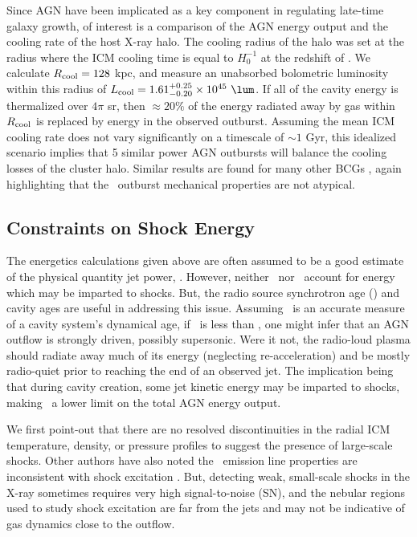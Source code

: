 \documentclass[useAMS,usenatbib]{mn2e}
\begin{document}
Since AGN have been implicated as a key component in regulating
late-time galaxy growth, of interest is a comparison of the AGN energy
output and the cooling rate of the host X-ray halo. The cooling radius
of the halo was set at the radius where the ICM cooling time is equal
to $H_0^{-1}$ at the redshift of \irs. We calculate $R_{\rm{cool}} =
128$ kpc, and measure an unabsorbed bolometric luminosity within this
radius of $L_{\rm{cool}} = 1.61^{+0.25}_{-0.20} \times 10^{45}
~\lum$. If all of the cavity energy is thermalized over $4\pi$ sr,
then $\approx 20\%$ of the energy radiated away by gas within
$R_{\rm{cool}}$ is replaced by energy in the observed
outburst. Assuming the mean ICM cooling rate does not vary
significantly on a timescale of $\sim 1$ Gyr, this idealized scenario
implies that 5 similar power AGN outbursts will balance the cooling
losses of the cluster halo. Similar results are found for many other
BCGs \citep[\eg][]{rafferty06}, again highlighting that the
\irs\ outburst mechanical properties are not atypical.

\subsection{Constraints on Shock Energy}

The energetics calculations given above are often assumed to be a good
estimate of the physical quantity jet power, \pjet. However, neither
\pcav\ nor \pjet\ account for energy which may be imparted to shocks.
But, the radio source synchrotron age (\tsync) and cavity ages are
useful in addressing this issue. Assuming \tsync\ is an accurate
measure of a cavity system's dynamical age, if \tsync\ is less than
\tsonic, one might infer that an AGN outflow is strongly driven,
possibly supersonic. Were it not, the radio-loud plasma should radiate
away much of its energy (neglecting re-acceleration) and be mostly
radio-quiet prior to reaching the end of an observed jet. The
implication being that during cavity creation, some jet kinetic energy
may be imparted to shocks, making \ecav\ a lower limit on the total
AGN energy output.

We first point-out that there are no resolved discontinuities in the
radial ICM temperature, density, or pressure profiles to suggest the
presence of large-scale shocks. Other authors have also noted the
\irs\ emission line properties are inconsistent with shock excitation
\citep{1996MNRAS.283.1003C, 2000AJ....120..562T}. But, detecting weak,
small-scale shocks in the X-ray sometimes requires very high
signal-to-noise (SN), and the nebular regions used to study shock
excitation are far from the jets and may not be indicative of gas
dynamics close to the outflow.
\end{document}
